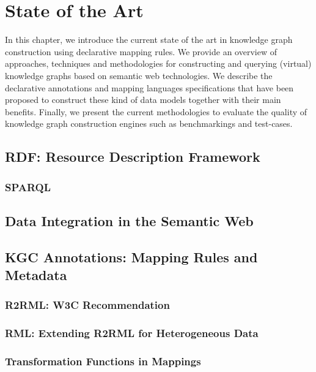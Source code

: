 \chapter{State of the Art}
\label{chap:soa}

In this chapter, we introduce the current state of the art in knowledge graph construction using declarative mapping rules. We provide an overview of approaches, techniques and methodologies for constructing and querying (virtual) knowledge graphs based on semantic web technologies. We describe the declarative annotations and mapping languages specifications that have been proposed to construct these kind of data models together with their main benefits. Finally, we present the current methodologies to evaluate the quality of knowledge graph construction engines such as benchmarkings and test-cases.


\section{RDF: Resource Description Framework}

\subsection{SPARQL}

\section{Data Integration in the Semantic Web}

\section{KGC Annotations: Mapping Rules and Metadata}

\subsection{R2RML: W3C Recommendation}

\subsection{RML: Extending R2RML for Heterogeneous Data}

\subsection{Transformation Functions in Mappings}

